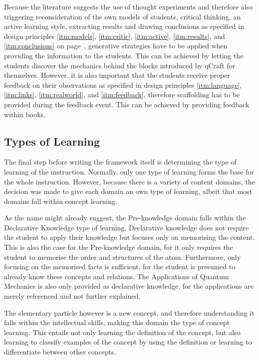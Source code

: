 \documentclass[11pt,twoside]{report} %
\begin{document}
Because the literature suggests the use of thought experiments and therefore also triggering reconsideration of the own models of students, critical thinking, an active learning style, extracting results and drawing conclusions as specified in design principles \ref{itm:models}, \ref{itm:critic}, \ref{itm:active}, \ref{itm:results}, and \ref{itm:conclusions} on page~\pageref{itm:models}, generative strategies have to be applied when providing the information to the students. This can be achieved by letting the students discover the mechanics behind the blocks introduced by qCraft for themselves. However, it is also important that the students receive proper feedback on their observations as specified in design principles \ref{itm:language}, \ref{itm:links}, \ref{itm:realworld}, and \ref{itm:feedback}, therefore scaffolding has to be provided during the feedback event. This can be achieved by providing feedback within books.

\subsection{Types of Learning}

The final step before writing the framework itself is determining the type of learning of the instruction. Normally, only one type of learning forms the base for the whole instruction. However, because there is a variety of content domains, the decision was made to give each domain an own type of learning, albeit that most domains fall within concept learning.

As the name might already suggest, the Pre-knowledge domain falls within the Declarative Knowledge type of learning. Declarative knowledge does not require the student to apply their knowledge but focuses only on memorising the content. This is also the case for the Pre-knowledge domain, for it only requires the student to memorise the order and structures of the atom. Furthermore, only focusing on the memorised facts is sufficient, for the student is presumed to already know these concepts and relations. The Applications of Quantum Mechanics is also only provided as declarative knowledge, for the applications are merely referenced and not further explained.

The elementary particle however is a new concept, and therefore understanding it falls within the intellectual skills, making this domain the type of concept learning. This entails not only learning the definition of the concept, but also learning to classify examples of the concept by using the definition or learning to differentiate between other concepts.
\end{document}
